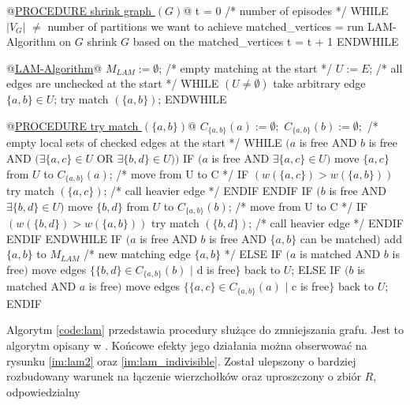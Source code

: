 \newpage
\begin{pseudocode}
@\underline{PROCEDURE shrink graph $(G)$}@
  t = 0 /* number of episodes */
  WHILE $|V_{G}|$ $\neq$ number of partitions we want to achieve
    matched_vertices = run LAM-Algorithm on $G$
    shrink $G$ based on the matched_vertices
    t = t + 1
  ENDWHILE


@\underline{LAM-Algorithm}@
  $M_{LAM} := \emptyset$; /* empty matching at the start */
  $U := E$; /* all edges are unchecked at the start */
  WHILE $(U \neq \emptyset)$
    take arbitrary edge $\{a,b\} \in U$;
    try match $(\{a,b\})$;
  ENDWHILE


@\underline{PROCEDURE try match $(\{a,b\})$}@
  $C_{\{a,b\}}(a) := \emptyset;$ $ C_{\{a,b\}}(b) := \emptyset;$ /* empty local sets of checked edges at the start */
  WHILE $(a$ is free AND $b$ is free AND $(\exists \{a,c\} \in U$ OR $\exists \{b,d\} \in U))$
    IF $(a$ is free AND $\exists \{a,c\} \in U)$
      move $\{a,c\}$ from $U$ to $C_{\{a,b\}}(a)$; /* move from U to C */
      IF $(w(\{a,c\}) > w(\{a,b\}))$
        try match $(\{a,c\})$; /* call heavier edge */
      ENDIF
    ENDIF
    IF $(b$ is free AND $\exists \{b,d\} \in U)$
      move $\{b,d\}$ from $U$ to $C_{\{a,b\}}(b)$; /* move from U to C */
      IF $(w(\{b,d\}) > w(\{a,b\}))$
        try match $(\{b,d\})$; /* call heavier edge */
      ENDIF
    ENDIF
  ENDWHILE
  IF $(a$ is free AND $b$ is free AND $\{a,b\}$ can be matched$)$
    add $\{a,b\}$ to $M_{LAM}$  /* new matching edge $\{a,b\}$ */
  ELSE IF $(a$ is matched AND $b$ is free$)$
    move edges $\{ \{b,d\} \in C_{\{a,b\}}(b)$ $|$ d is free$\}$ back to $U$;
  ELSE IF $(b$ is matched AND $a$ is free$)$
    move edges $\{ \{a,c\} \in C_{\{a,b\}}(a)$ $|$ c is free$\}$ back to $U$;
  ENDIF
\end{pseudocode}
\vspace{-8mm}
\label{code:lam}
\newpage
Algorytm \ref{code:lam} przedstawia procedury służące do zmniejszania grafu.
Jest to algorytm opisany w \cite{weighted_maching}.
Końcowe efekty jego działania można obserwować na rysunku \ref{im:lam2} oraz \ref{im:lam_indivisible}.
Został ulepszony o bardziej rozbudowany warunek na łączenie wierzchołków oraz uproszczony o zbiór $R$, odpowiedzialny
